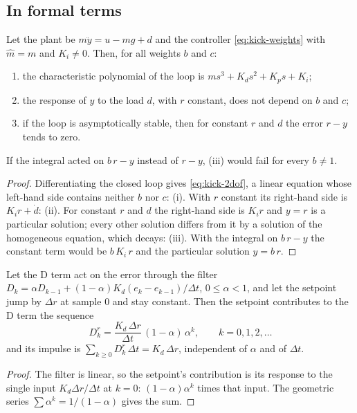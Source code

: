 \subsection{In formal terms}

\begin{theorem}
\label{thm:kick-2dof}
Let the plant be $m\ddot y = u - mg + d$ and the controller \cref{eq:kick-weights} with $\hat m = m$ and $K_i \ne 0$. Then, for all weights $b$ and $c$:
\begin{enumerate}[label=(\roman*)]
  \item the characteristic polynomial of the loop is $m s^3 + K_d s^2 + K_p s + K_i$;
  \item the response of $y$ to the load $d$, with $r$ constant, does not depend on $b$ and $c$;
  \item if the loop is asymptotically stable, then for constant $r$ and $d$ the error $r - y$ tends to zero.
\end{enumerate}
If the integral acted on $b\,r - y$ instead of $r - y$, (iii) would fail for every $b \ne 1$.
\end{theorem}
\begin{proof}
Differentiating the closed loop gives \cref{eq:kick-2dof}, a linear equation whose left-hand side contains neither $b$ nor $c$: (i). With $r$ constant its right-hand side is $K_i r + \dot d$: (ii). For constant $r$ and $d$ the right-hand side is $K_ir$ and $y = r$ is a particular solution; every other solution differs from it by a solution of the homogeneous equation, which decays: (iii). With the integral on $b\,r - y$ the constant term would be $b\,K_i\,r$ and the particular solution $y = b\,r$.
\end{proof}

\begin{theorem}
\label{thm:kick-impulse}
Let the D term act on the error through the filter $D_k = \alpha D_{k-1} + (1-\alpha)K_d(e_k - e_{k-1})/\Delta t$, $0 \le \alpha < 1$, and let the setpoint jump by $\Delta r$ at sample $0$ and stay constant. Then the setpoint contributes to the D term the sequence
\begin{equation*}
  D^{r}_k = \frac{K_d\,\Delta r}{\Delta t}\,(1 - \alpha)\,\alpha^k, \qquad k = 0, 1, 2, \dots
\end{equation*}
and its impulse is $\sum_{k \ge 0} D^{r}_k\,\Delta t = K_d\,\Delta r$, independent of $\alpha$ and of $\Delta t$.
\end{theorem}
\begin{proof}
The filter is linear, so the setpoint's contribution is its response to the single input $K_d\Delta r/\Delta t$ at $k = 0$: $(1-\alpha)\alpha^k$ times that input. The geometric series $\sum\alpha^k = 1/(1-\alpha)$ gives the sum.
\end{proof}

